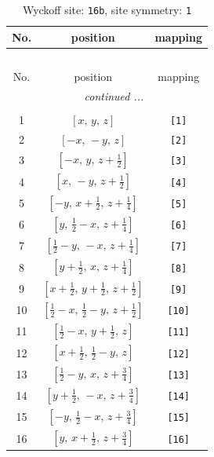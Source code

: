 \documentclass[fleqn,8pt]{jsarticle}
\begin{document}
\begin{longtable}{ccc}
\caption{Wyckoff site: {\tt 16b}, site symmetry: {\tt 1}}
 \\
 \hline \hline
No. & position & mapping \\ \hline \endfirsthead

\multicolumn{2}{l}{\tablename\ \thetable{}} \\
 \hline \hline
No. & position & mapping \\ \hline \endhead

 \hline \hline
\multicolumn{2}{r}{\footnotesize\it continued ...} \\ \endfoot

 \hline \hline
\multicolumn{2}{r}{} \\ \endlastfoot

1 & $\left[ x,\, y,\, z \right]$ & {\tt [1]} \\ \hline
2 & $\left[ - x,\, - y,\, z \right]$ & {\tt [2]} \\ \hline
3 & $\left[ - x,\, y,\, z + \frac{1}{2} \right]$ & {\tt [3]} \\ \hline
4 & $\left[ x,\, - y,\, z + \frac{1}{2} \right]$ & {\tt [4]} \\ \hline
5 & $\left[ - y,\, x + \frac{1}{2},\, z + \frac{1}{4} \right]$ & {\tt [5]} \\ \hline
6 & $\left[ y,\, \frac{1}{2} - x,\, z + \frac{1}{4} \right]$ & {\tt [6]} \\ \hline
7 & $\left[ \frac{1}{2} - y,\, - x,\, z + \frac{1}{4} \right]$ & {\tt [7]} \\ \hline
8 & $\left[ y + \frac{1}{2},\, x,\, z + \frac{1}{4} \right]$ & {\tt [8]} \\ \hline
9 & $\left[ x + \frac{1}{2},\, y + \frac{1}{2},\, z + \frac{1}{2} \right]$ & {\tt [9]} \\ \hline
10 & $\left[ \frac{1}{2} - x,\, \frac{1}{2} - y,\, z + \frac{1}{2} \right]$ & {\tt [10]} \\ \hline
11 & $\left[ \frac{1}{2} - x,\, y + \frac{1}{2},\, z \right]$ & {\tt [11]} \\ \hline
12 & $\left[ x + \frac{1}{2},\, \frac{1}{2} - y,\, z \right]$ & {\tt [12]} \\ \hline
13 & $\left[ \frac{1}{2} - y,\, x,\, z + \frac{3}{4} \right]$ & {\tt [13]} \\ \hline
14 & $\left[ y + \frac{1}{2},\, - x,\, z + \frac{3}{4} \right]$ & {\tt [14]} \\ \hline
15 & $\left[ - y,\, \frac{1}{2} - x,\, z + \frac{3}{4} \right]$ & {\tt [15]} \\ \hline
16 & $\left[ y,\, x + \frac{1}{2},\, z + \frac{3}{4} \right]$ & {\tt [16]} \\
\end{longtable}
\end{document}

